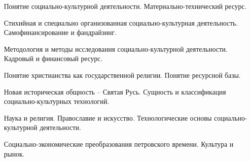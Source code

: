 \documentclass[
	14pt,
	a4paper,
	]
	{scrartcl}
\begin{document}
\shapk
{}
\setcounter{zad}{0}

\vfill
\z Понятие социально-культурной деятельности.
 \vfill
\z Материально-технический ресурс. \vfill

\vfill

\newpage


\shapk
{}
\setcounter{zad}{0}

\vfill
\z Стихийная и специально организованная социально-культурная деятельность.
 \vfill
\z Самофинансирование и фандрайзинг.
 \vfill

\vfill

\newpage


\shapk
{}
\setcounter{zad}{0}

\vfill
\z Методология и методы исследования социально-культурной деятельности.
 \vfill
\z Кадровый и финансовый ресурс.
 \vfill

\vfill

\newpage


\shapk
{}
\setcounter{zad}{0}

\vfill
\z Понятие христианства как государственной религии.
 \vfill
\z Понятие ресурсной базы.
 \vfill

\vfill

\newpage


\shapk
{}
\setcounter{zad}{0}

\vfill
\z Новая историческая общность – Святая Русь.
 \vfill
\z Сущность и классификация социально-культурных технологий.
 \vfill

\vfill

\newpage


\shapk
{}
\setcounter{zad}{0}

\vfill
\z Наука и религия. Православие и искусство.
 \vfill
\z Технологические основы социально-культурной деятельности.
 \vfill

\vfill

\newpage


\shapk
{}
\setcounter{zad}{0}

\vfill
\z Социально-экономические преобразования петровского времени.
 \vfill
\z Культура и рынок.
 \vfill

\vfill

\newpage


\shapk
{}
\setcounter{zad}{0}
\end{document}
